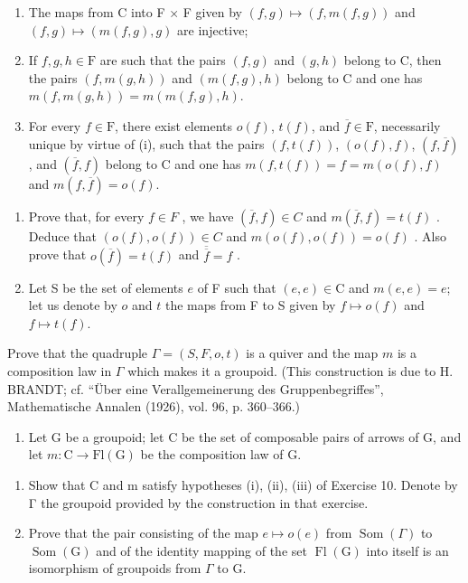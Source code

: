 \begin{enumerate}
\def\labelenumi{(\roman{enumi})}
\item
  The maps from C into F × F given by \((f,g)\mapsto(f,m(f,g))\) and \((f,g)\mapsto(m(f,g),g)\) are injective;
\item
  If \(f, g, h \in \mathrm{F}\) are such that the pairs \((f, g)\) and \((g, h)\) belong to C, then the pairs \((f, m(g, h))\) and \((m(f, g), h)\) belong to C and one has \(m(f, m(g, h)) = m(m(f, g), h)\).
\item
  For every \(f \in \mathrm{F}\), there exist elements \(o(f)\), \(t(f)\), and \(\overline{f} \in \mathrm{F}\), necessarily unique by virtue of (i), such that the pairs \((f, t(f))\), \((o(f), f)\), \((f, \overline{f})\), and \((\overline{f}, f)\) belong to C and one has \(m(f, t(f)) = f = m(o(f), f)\) and \(m(f, \overline{f}) = o(f)\).
\end{enumerate}

\begin{enumerate}
\def\labelenumi{\alph{enumi})}
\item
  Prove that, for every \(f \in F\) , we have \((\overline{f}, f) \in C\) and \(m(\overline{f}, f) = t(f)\) . Deduce that \((o(f), o(f)) \in C\) and \(m(o(f), o(f)) = o(f)\) . Also prove that \(o(\overline{f}) = t(f)\) and \(\overline{\overline{f}} = f\) .
\item
  Let S be the set of elements \(e\) of F such that \((e,e)\in\mathrm{C}\) and \(m(e,e)=e\); let us denote by \(o\) and \(t\) the maps from F to S given by \(f\mapsto o(f)\) and \(f\mapsto t(f)\).
\end{enumerate}

Prove that the quadruple \(\Gamma = (S, F, o, t)\) is a quiver and the map \(m\) is a composition law in \(\Gamma\) which makes it a groupoid. (This construction is due to H. BRANDT; cf. “Über eine Verallgemeinerung des Gruppenbegriffes”, Mathematische Annalen (1926), vol. 96, p. 360–366.)

\begin{enumerate}
\def\labelenumi{\arabic{enumi})}
\setcounter{enumi}{10}
\tightlist
\item
  Let G be a groupoid; let C be the set of composable pairs of arrows of G, and let \(m\colon\mathrm{C}\to\mathrm{Fl}(\mathrm{G})\) be the composition law of G.
\end{enumerate}

\begin{enumerate}
\def\labelenumi{\alph{enumi})}
\item
  Show that C and m satisfy hypotheses (i), (ii), (iii) of Exercise 10. Denote by Γ the groupoid provided by the construction in that exercise.
\item
  Prove that the pair consisting of the map \(e \mapsto o(e)\) from \(\operatorname{Som}(\Gamma)\) to \(\operatorname{Som}(\mathrm{G})\) and of the identity mapping of the set \(\operatorname{Fl}(\mathrm{G})\) into itself is an isomorphism of groupoids from \(\Gamma\) to G.
\end{enumerate}

